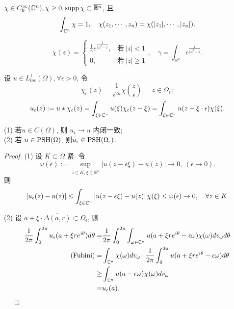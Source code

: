 \begin{definition}[磨光算子]
  $\chi \in C_{0}^{\infty }({\mathbb C}^n), \chi \geq 0, \operatorname{supp} \chi \subset \overline{\mathbb{B}^n}$, 且 
  $$\int_{{\mathbb C}^n} \chi =1, \quad \chi (z_1,\cdots ,z_n)=\chi (|z_1|,\cdots ,|z_n|).$$  
\end{definition}
\begin{example}
  $$ \chi (z) = \begin{cases}
    \frac{1}{\gamma } e^{\frac{1}{\left| z \right|^2-1 }}, &\text{若}~ |z| <1\\
    0, &\text{若}~ |z| \geq 1
  \end{cases} , \quad \gamma =\int_{\mathbb{B}^n}  e^{\frac{1}{\left| z \right|^2-1 }}.$$
\end{example}

设 $u \in L_{loc}^{1}(\Omega ), \forall  \epsilon >0$, 令 
$$ \chi _{\epsilon }(z)=\frac{1}{\epsilon ^{2n}} \chi \left( \frac{z}{\epsilon } \right), \quad z \in \Omega _{\epsilon };$$ 
$$ u_{\epsilon }(z):=u * \chi _{\epsilon }(z)=\int_{\xi \in {\mathbb C}^n} u(\xi ) \chi _{\epsilon } (z-\xi )=\int_{\xi \in {\mathbb C}^n } u(z-\xi \cdot \epsilon )\chi (\xi ).$$

\begin{lemma}
  (1) 若$u \in C(\Omega )$, 则 $u_{\epsilon } \to u$ 内闭一致;\\
  (2) 若 $u \in \operatorname{PSH} (\Omega ) $, 则$ u_{\epsilon } \in \operatorname{PSH} (\Omega _{\epsilon })$.  
\end{lemma}
\begin{proof}
  (1) 设 $K \subset \Omega $ 紧. 
  令
  $$ \omega (\epsilon ):=\sup_{z \in K, \xi \in \overline{\mathbb{B}^n}}\left| u(z-\epsilon \xi )-u(z) \right| \to 0, ~ (\epsilon \to 0). $$  
  则
  $$ \left| u_{\epsilon }(z)-u(z) \right| \leq \int_{\xi \in {\mathbb C}^n} \left| u(z-\epsilon \xi )-u(z) \right| \chi (\xi ) \leq \omega (\epsilon ) \to 0, \quad \forall  z \in K. $$

  (2) 设 $a+\xi \cdot  \overline{\Delta (a,r)} \subset \Omega _{\epsilon }$, 则 
  $$ \begin{aligned}
    \frac{1}{2 \pi }\int_{0}^{2 \pi } u_{\epsilon }(a +\xi r e^{i \theta}) d \theta =& \frac{1}{2 \pi }\int_{0}^{2 \pi } \int_{\omega  \in {\mathbb C}^n} u(a+\xi r e^{i \theta }-\epsilon \omega )\chi (\omega )dv_{\omega }d \theta \\
  (\text{Fubini})  =& \int_{{\mathbb C}^n} \chi (\omega ) dv_{\omega } \cdot  \frac{1}{2 \pi } \int_{0}^{2 \pi } u(a+\xi r e^{i \theta }-\epsilon \omega )d \theta \\
  \geq & \int_{{\mathbb C}^n} u(a-\epsilon \omega  ) \chi (\omega ) dv_{\omega }\\
  =& u_{\epsilon }(a).
  \end{aligned}  $$ 
  ~~
\end{proof}

